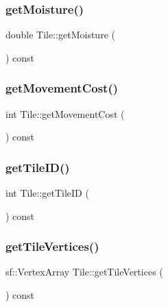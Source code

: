 \subsubsection{\texorpdfstring{get\+Moisture()}{getMoisture()}}
{\footnotesize\ttfamily double Tile\+::get\+Moisture (\begin{DoxyParamCaption}{ }\end{DoxyParamCaption}) const}

\mbox{\label{class_tile_ad74eb4bf920e8dab5af3d410643e8e8d}} 
\subsubsection{\texorpdfstring{get\+Movement\+Cost()}{getMovementCost()}}
{\footnotesize\ttfamily int Tile\+::get\+Movement\+Cost (\begin{DoxyParamCaption}{ }\end{DoxyParamCaption}) const}

\mbox{\label{class_tile_ae88240c2fc1f77f6dae91c2b905f70c5}} 
\subsubsection{\texorpdfstring{get\+Tile\+I\+D()}{getTileID()}}
{\footnotesize\ttfamily int Tile\+::get\+Tile\+ID (\begin{DoxyParamCaption}{ }\end{DoxyParamCaption}) const}

\mbox{\label{class_tile_ab3414f28d4e7334903bc9e8f8451ccee}} 
\subsubsection{\texorpdfstring{get\+Tile\+Vertices()}{getTileVertices()}}
{\footnotesize\ttfamily sf\+::\+Vertex\+Array Tile\+::get\+Tile\+Vertices (\begin{DoxyParamCaption}{ }\end{DoxyParamCaption}) const}

